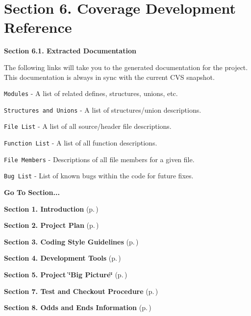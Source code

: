 \section{Section 6.  Coverage Development Reference}\label{page_code_details}
 \begin{Desc}
\item[{\bf Section 6.1.  Extracted Documentation}]\par
 The following links will take you to the generated documentation for the project. This documentation is always in sync with the current CVS snapshot.

\begin{CompactItemize}
\item 
{\tt Modules} - A list of related defines, structures, unions, etc.\item 
{\tt Structures and Unions} - A list of structures/union descriptions.\item 
{\tt File List} - A list of all source/header file descriptions.\item 
{\tt Function List} - A list of all function descriptions.\item 
{\tt File Members} - Descriptions of all file members for a given file.\item 
{\tt Bug List} - List of known bugs within the code for future fixes.\end{CompactItemize}
\end{Desc}


\begin{Desc}
\item[{\bf Go To Section...}]\par
\begin{CompactItemize}
\item 
{\bf Section 1.  Introduction} {\rm (p.\,\pageref{page_intro})}\item 
{\bf Section 2.  Project Plan} {\rm (p.\,\pageref{page_project_plan})}\item 
{\bf Section 3.  Coding Style Guidelines} {\rm (p.\,\pageref{page_code_style})}\item 
{\bf Section 4.  Development Tools} {\rm (p.\,\pageref{page_tools})}\item 
{\bf Section 5.  Project \char`\"{}Big Picture\char`\"{}} {\rm (p.\,\pageref{page_big_picture})}\item 
{\bf Section 7.  Test and Checkout Procedure} {\rm (p.\,\pageref{page_testing})}\item 
{\bf Section 8.  Odds and Ends Information} {\rm (p.\,\pageref{page_misc})}\end{CompactItemize}
\end{Desc}
